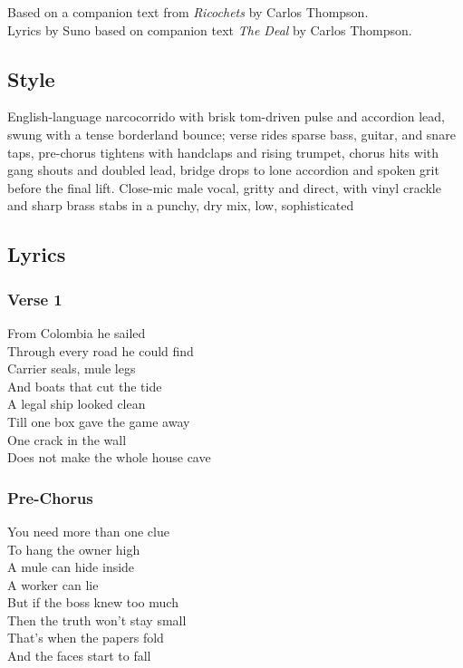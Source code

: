 Based on a companion text from \emph{Ricochets} by Carlos Thompson.\\
Lyrics by Suno based on companion text \emph{The Deal} by Carlos
Thompson.

\subsection{Style}\label{style-14}

English-language narcocorrido with brisk tom-driven pulse and accordion
lead, swung with a tense borderland bounce; verse rides sparse bass,
guitar, and snare taps, pre-chorus tightens with handclaps and rising
trumpet, chorus hits with gang shouts and doubled lead, bridge drops to
lone accordion and spoken grit before the final lift. Close-mic male
vocal, gritty and direct, with vinyl crackle and sharp brass stabs in a
punchy, dry mix, low, sophisticated

\subsection{Lyrics}\label{lyrics-14}

\subsubsection{Verse 1}\label{verse-1-10}

From Colombia he sailed\\
Through every road he could find\\
Carrier seals, mule legs\\
And boats that cut the tide\\
A legal ship looked clean\\
Till one box gave the game away\\
One crack in the wall\\
Does not make the whole house cave

\subsubsection{Pre-Chorus}\label{pre-chorus-10}

You need more than one clue\\
To hang the owner high\\
A mule can hide inside\\
A worker can lie\\
But if the boss knew too much\\
Then the truth won't stay small\\
That's when the papers fold\\
And the faces start to fall

